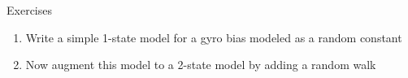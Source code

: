 \begin{frame}
Exercises
 \begin{enumerate}
 \item Write a simple 1-state model for a gyro bias modeled as a random constant
 \item Now augment this model to a 2-state model by adding a random walk
\end{enumerate}
\end{frame}
